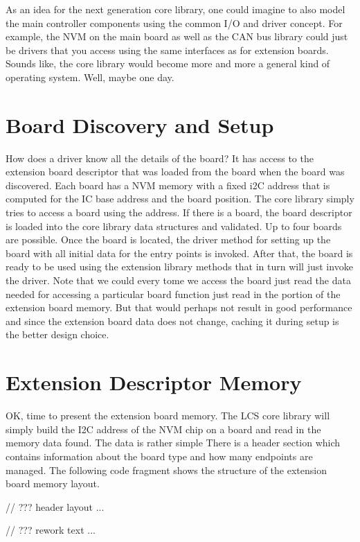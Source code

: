 As an idea for the next generation core library, one could imagine to also model the main controller components using the common I/O and driver concept. For example, the NVM on the main board as well as the CAN bus library could just be drivers that you access using the same interfaces as for extension boards. Sounds like, the core library would become more and more a general kind of operating system. Well, maybe one day.

\section{Board Discovery and Setup}

How does a driver know all the details of the board? It has access to the extension board descriptor that was loaded from the board when the board was discovered. Each board has a NVM memory with a fixed i2C address that is computed for the IC base address and the board position. The core library simply tries to access a board using the address. If there is a board, the board descriptor is loaded into the core library data structures and validated. Up to four boards are possible. Once the board is located, the driver method for setting up the board with all initial data for the entry points is invoked. After that, the board is ready to be used using the extension library methods that in turn will just invoke the driver. Note that we could every tome we access the board just read the data needed for accessing a particular board function just read in the portion of the extension board memory. But that would perhaps not result in good performance and since the extension board data does not change, caching it during setup is the better design choice.

\section{Extension Descriptor Memory}

OK, time to present the extension board memory. The LCS core library will simply build the I2C address of the NVM chip on a board and read in the memory data found. The data is rather simple There is a header section which contains information about the board type and how many endpoints are managed. The following code fragment shows the structure of the extension board memory layout.

// ??? header layout ...

// ??? rework text ...


